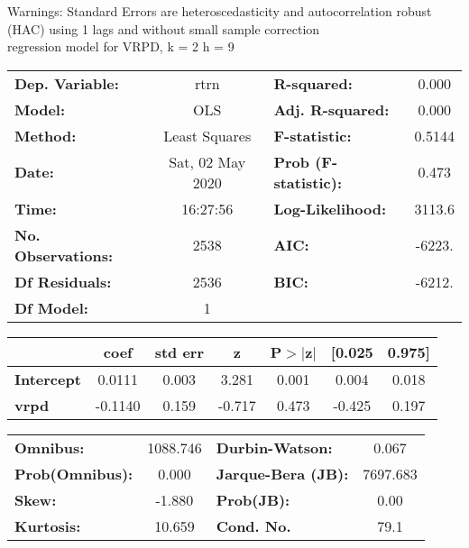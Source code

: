Warnings: \newline
 [1] Standard Errors are heteroscedasticity and autocorrelation robust (HAC) using 1 lags and without small sample correction\\ 

regression model for VRPD, k = 2 h = 9\begin{center}
\begin{tabular}{lclc}
\toprule
\textbf{Dep. Variable:}    &       rtrn       & \textbf{  R-squared:         } &     0.000   \\
\textbf{Model:}            &       OLS        & \textbf{  Adj. R-squared:    } &     0.000   \\
\textbf{Method:}           &  Least Squares   & \textbf{  F-statistic:       } &    0.5144   \\
\textbf{Date:}             & Sat, 02 May 2020 & \textbf{  Prob (F-statistic):} &    0.473    \\
\textbf{Time:}             &     16:27:56     & \textbf{  Log-Likelihood:    } &    3113.6   \\
\textbf{No. Observations:} &        2538      & \textbf{  AIC:               } &    -6223.   \\
\textbf{Df Residuals:}     &        2536      & \textbf{  BIC:               } &    -6212.   \\
\textbf{Df Model:}         &           1      & \textbf{                     } &             \\
\bottomrule
\end{tabular}
\begin{tabular}{lcccccc}
                   & \textbf{coef} & \textbf{std err} & \textbf{z} & \textbf{P$> |$z$|$} & \textbf{[0.025} & \textbf{0.975]}  \\
\midrule
\textbf{Intercept} &       0.0111  &        0.003     &     3.281  &         0.001        &        0.004    &        0.018     \\
\textbf{vrpd}      &      -0.1140  &        0.159     &    -0.717  &         0.473        &       -0.425    &        0.197     \\
\bottomrule
\end{tabular}
\begin{tabular}{lclc}
\textbf{Omnibus:}       & 1088.746 & \textbf{  Durbin-Watson:     } &    0.067  \\
\textbf{Prob(Omnibus):} &   0.000  & \textbf{  Jarque-Bera (JB):  } & 7697.683  \\
\textbf{Skew:}          &  -1.880  & \textbf{  Prob(JB):          } &     0.00  \\
\textbf{Kurtosis:}      &  10.659  & \textbf{  Cond. No.          } &     79.1  \\
\bottomrule
\end{tabular}
\end{center}

